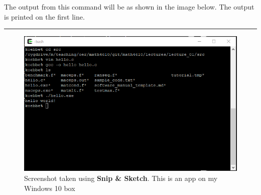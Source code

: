\documentclass[10pt,fleqn]{article}
\begin{document}
The output from this command will be as shown in the image below. The output is
printed on the first line.
\vskip0.1in\hrule\vskip0.1in
\vfill
\begin{figure}[h]
\centering
\includegraphics{../images/coding_06.png}
\caption{{Screenshot} taken using {\bf Snip \& Sketch}. This is an app on
         my Windows 10 box}
\end{figure}
\eject
\end{document}
